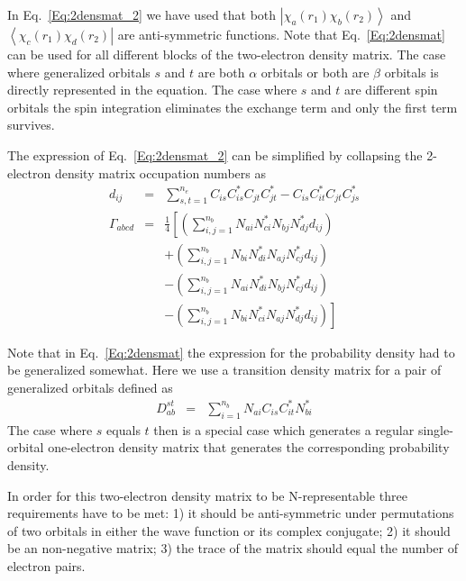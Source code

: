 \documentclass[pra]{revtex4-1}
\begin{document}
In Eq.~\ref{Eq:2densmat_2} we have used that both
$\left|\chi_a(r_1)\chi_b(r_2)\right\rangle$ and 
$\left\langle\chi_c(r_1)\chi_d(r_2)\right|$ are anti-symmetric functions.
Note that Eq.~\ref{Eq:2densmat} can be used for all different blocks of the
two-electron density matrix. The case where generalized orbitals $s$ and $t$ 
are both $\alpha$ orbitals or both are $\beta$ orbitals is directly represented
in the equation. The case where $s$ and $t$ are different spin orbitals the
spin integration eliminates the exchange term and only the first term survives.

The expression of Eq.~\ref{Eq:2densmat_2} can be simplified by collapsing the 
2-electron density matrix occupation numbers as
\begin{eqnarray}
  d_{ij}
  &=& 
      \sum_{s,t=1}^{n_e}
      C_{is}C^*_{is}
      C_{jt}C^*_{jt}
    - C_{is}C^*_{it}
      C_{jt}C^*_{js}
      \label{Eq:2occupation_3} \\
  \Gamma_{abcd}
  &=& \frac{1}{4}
      \left[
      \left(\sum_{i,j=1}^{n_b} N_{ai}N^*_{ci}N_{bj}N^*_{dj}d_{ij}\right)
      \right.
      \nonumber \\
  &&+ \left(\sum_{i,j=1}^{n_b} N_{bi}N^*_{di}N_{aj}N^*_{cj}d_{ij}\right)
      \nonumber \\
  &&- \left(\sum_{i,j=1}^{n_b} N_{ai}N^*_{di}N_{bj}N^*_{cj}d_{ij}\right)
      \nonumber \\
  &&- \left.
      \left(\sum_{i,j=1}^{n_b} N_{bi}N^*_{ci}N_{aj}N^*_{dj}d_{ij}\right)
      \right]
      \label{Eq:2densmat_3}
\end{eqnarray}


Note that in Eq.~\ref{Eq:2densmat} the expression for the probability density
had to be generalized somewhat. Here we use a transition density matrix
for a pair of generalized orbitals defined as
\begin{eqnarray}
  D^{st}_{ab} &=& \sum_{i=1}^{n_b}N_{ai}C_{is}C^*_{it}N^*_{bi}
  \label{Eq:1orbmat}
\end{eqnarray}
The case where $s$ equals $t$ then is a special case which generates a regular
single-orbital one-electron density matrix that generates the corresponding
probability density.

In order for this two-electron density matrix to be N-representable 
three requirements have to be met: 1) it should be anti-symmetric under
permutations of two orbitals in either the wave function or its complex 
conjugate; 2) it should be an non-negative matrix; 3) the trace of the matrix
should equal the number of electron pairs.
\end{document}
